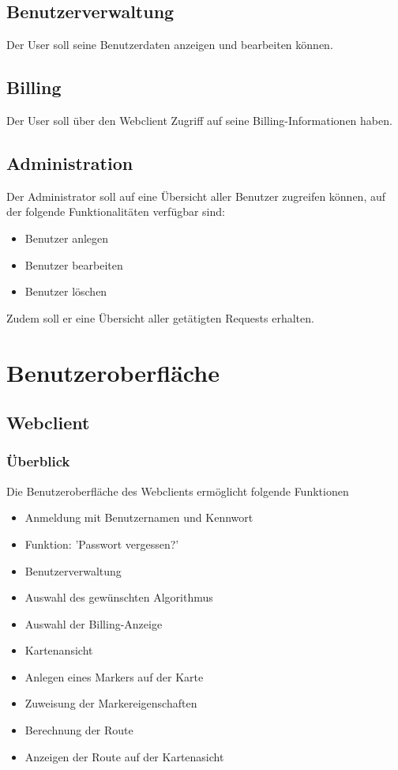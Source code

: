 \documentclass[a4paper,10pt,titlepage]{article}
\begin{document}
\subsection{Benutzerverwaltung}
Der User soll seine Benutzerdaten anzeigen und bearbeiten können.

\subsection{Billing}
Der User soll über den Webclient Zugriff auf seine Billing-Informationen haben.

\subsection{Administration}
Der Administrator soll auf eine Übersicht aller Benutzer zugreifen können, auf der folgende Funktionalitäten verfügbar sind:
\begin{itemize}
 \item Benutzer anlegen
 \item Benutzer bearbeiten
 \item Benutzer löschen
\end{itemize}

Zudem soll er eine Übersicht aller getätigten Requests erhalten.

\clearpage
\section{Benutzeroberfläche}

\subsection{Webclient}

\subsubsection{Überblick}
Die Benutzeroberfläche des Webclients ermöglicht folgende Funktionen
\begin{itemize}
\item Anmeldung mit Benutzernamen und Kennwort
\item Funktion: ’Passwort vergessen?’
\item Benutzerverwaltung
\item Auswahl des gewünschten Algorithmus
\item Auswahl der Billing-Anzeige 
\item Kartenansicht
\item Anlegen eines Markers auf der Karte
\item Zuweisung der Markereigenschaften
\item Berechnung der Route
\item Anzeigen der Route auf der Kartenasicht
\end{itemize}
\end{document}
